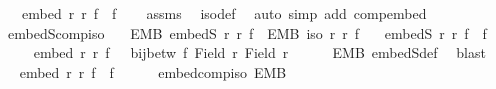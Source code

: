 \begin{isabellebody}
\ \ \ {\isachardoublequoteopen}embed\ r\ r{\isacharprime}{\kern0pt}{\isacharprime}{\kern0pt}\ {\isacharparenleft}{\kern0pt}f{\isacharprime}{\kern0pt}\ {\isasymcirc}\ f{\isacharparenright}{\kern0pt}{\isachardoublequoteclose}\isanewline
%
\isadelimproof
\ \ %
\endisadelimproof
%
\isatagproof
{}\isamarkupfalse%
\ assms\ \isamarkupfalse%
\ iso{\isacharunderscore}{\kern0pt}def\ \isamarkupfalse%
\ {\isacharparenleft}{\kern0pt}auto\ simp\ add{\isacharcolon}{\kern0pt}\ comp{\isacharunderscore}{\kern0pt}embed{\isacharparenright}{\kern0pt}%
\endisatagproof
{\isafoldproof}%
%
\isadelimproof
\isanewline
%
\endisadelimproof
\isanewline
{}\isamarkupfalse%
\ embedS{\isacharunderscore}{\kern0pt}comp{\isacharunderscore}{\kern0pt}iso{\isacharcolon}{\kern0pt}\isanewline
\ \ \ EMB{\isacharcolon}{\kern0pt}\ {\isachardoublequoteopen}embedS\ r\ r{\isacharprime}{\kern0pt}\ f{\isachardoublequoteclose}\ \ EMB{\isacharprime}{\kern0pt}{\isacharcolon}{\kern0pt}\ {\isachardoublequoteopen}iso\ r{\isacharprime}{\kern0pt}\ r{\isacharprime}{\kern0pt}{\isacharprime}{\kern0pt}\ f{\isacharprime}{\kern0pt}{\isachardoublequoteclose}\isanewline
\ \ \ {\isachardoublequoteopen}embedS\ r\ r{\isacharprime}{\kern0pt}{\isacharprime}{\kern0pt}\ {\isacharparenleft}{\kern0pt}f{\isacharprime}{\kern0pt}\ {\isasymcirc}\ f{\isacharparenright}{\kern0pt}{\isachardoublequoteclose}\isanewline
%
\isadelimproof
%
\endisadelimproof
%
\isatagproof
{}\isamarkupfalse%
\ {\isacharminus}{\kern0pt}\isanewline
\ \ \isamarkupfalse%
\ {\isasymsection}{\isacharcolon}{\kern0pt}\ {\isachardoublequoteopen}embed\ r\ r{\isacharprime}{\kern0pt}\ f\ {\isasymand}\ {\isasymnot}\ bij{\isacharunderscore}{\kern0pt}betw\ f\ {\isacharparenleft}{\kern0pt}Field\ r{\isacharparenright}{\kern0pt}\ {\isacharparenleft}{\kern0pt}Field\ r{\isacharprime}{\kern0pt}{\isacharparenright}{\kern0pt}{\isachardoublequoteclose}\isanewline
\ \ \ \ \isamarkupfalse%
\ EMB\ embedS{\isacharunderscore}{\kern0pt}def\ \isamarkupfalse%
\ blast\isanewline
\ \ \isamarkupfalse%
\ \isamarkupfalse%
\ {\isachardoublequoteopen}embed\ r\ r{\isacharprime}{\kern0pt}{\isacharprime}{\kern0pt}\ {\isacharparenleft}{\kern0pt}f{\isacharprime}{\kern0pt}\ {\isasymcirc}\ f{\isacharparenright}{\kern0pt}{\isachardoublequoteclose}\isanewline
\ \ \ \ \isamarkupfalse%
\ embed{\isacharunderscore}{\kern0pt}comp{\isacharunderscore}{\kern0pt}iso\ EMB{\isacharprime}{\kern0pt}\ \isamarkupfalse%

\end{isabellebody}
